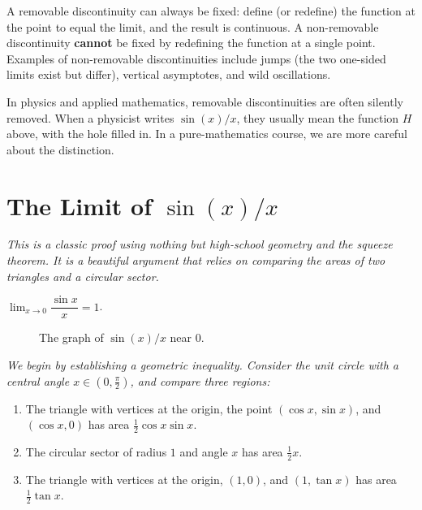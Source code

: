 \begin{remark}
A removable discontinuity can always be fixed: define (or redefine) the function at the point to equal the limit, and the result is continuous.  A non-removable discontinuity \textbf{cannot} be fixed by redefining the function at a single point.  Examples of non-removable discontinuities include jumps (the two one-sided limits exist but differ), vertical asymptotes, and wild oscillations.
\end{remark}

\begin{remark}
In physics and applied mathematics, removable discontinuities are often silently removed.  When a physicist writes $\sin(x)/x$, they usually mean the function $H$ above, with the hole filled in.  In a pure-mathematics course, we are more careful about the distinction.
\end{remark}

\section{The Limit of $\sin(x)/x$}
\label{sec:2.18}

\textit{This is a classic proof using nothing but high-school geometry and the squeeze theorem.  It is a beautiful argument that relies on comparing the areas of two triangles and a circular sector.}

\begin{theorem}
\label{thm:2-13}
$\displaystyle\lim_{x \to 0} \dfrac{\sin x}{x} = 1$.
\end{theorem}

\begin{figure}[ht]
  \centering
  
  \caption{The graph of $\sin(x)/x$ near $0$.}
  \label{fig:sinx-over-x}
\end{figure}

\textit{We begin by establishing a geometric inequality.  Consider the unit circle with a central angle $x \in (0, \frac{\pi}{2})$, and compare three regions:}
\begin{enumerate}[label=(\roman*)]
  \item The triangle with vertices at the origin, the point $(\cos x, \sin x)$, and $(\cos x, 0)$ has area $\frac{1}{2}\cos x \sin x$.
  \item The circular sector of radius $1$ and angle $x$ has area $\frac{1}{2}x$.
  \item The triangle with vertices at the origin, $(1, 0)$, and $(1, \tan x)$ has area $\frac{1}{2}\tan x$.
\end{enumerate}

